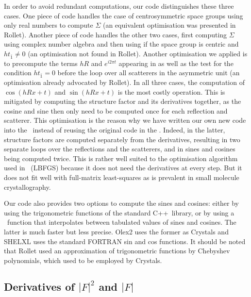 \documentclass[11pt]{article}
\newcommand{\cpp}{C++}
\newcommand{\modulus}[1]{\left| #1 \right|}
\begin{document}
In order to avoid redundant computations, our code distinguishes these three cases. One piece of code handles the case of centrosymmetric space groups using only real numbers to compute $\Sigma$ (an equivalent optimisation was presented in Rollet). Another piece of code handles the other two cases, first computing $\Sigma$ using complex number algebra and then using  if the space group is centric and $h t_{\bar{1}} \neq 0$ (an optimisation not found in Rollet). Another optimisation we applied is to precompute the terms $hR$ and $e^{i2\pi t}$ appearing in  as well as the test for the condition $h t_{\bar{1}}=0$ before the loop over all scatterers in the asymmetric unit (an optimisation already advocated by Rollet). In all three cases, the computation of $\cos(hRx + t)$ and $\sin(hRx + t)$ is the most costly operation. This is mitigated by computing the structure factor and its derivatives together, as the cosine and sine then only need to be computed once for each reflection and scatterer.
This optimisation is the reason why we have written our own new code into the \smtbx\ instead of reusing the original code in the \cctbx. Indeed, in the latter, structure factors are computed separately from the derivatives, resulting in two separate loops over the reflections and the scatterers, and in sines and cosines being computed twice. This is rather well suited to the optimisation algorithm used in \phenixrefine\ (LBFGS) because it does not need the derivatives at every step. But it does not fit well with full-matrix least-squares as is prevalent in small molecule crystallography.  

Our code also provides two options to compute the sines and cosines: either by using the trigonometric functions of the standard \cpp\ library, or by using a \cctbx\ function that interpolates between tabulated values of sines and cosines. The latter is much faster but less precise. Olex2 uses the former as Crystals and SHELXL uses the standard FORTRAN sin and cos functions. It should be noted that Rollet used an approximation of trigonometric functions by Chebyshev polynomials, which used to be employed by Crystals.

\subsection{Derivatives of $\modulus{F}^2$ and $\modulus{F}$}
\end{document}
